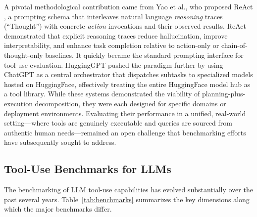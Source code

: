 \documentclass[conference]{IEEEtran}
\begin{document}
A pivotal methodological contribution came from Yao et al., who proposed ReAct \cite{yao2023react}, a prompting schema that interleaves natural language \emph{reasoning} traces (``Thought'') with concrete \emph{action} invocations and their observed results. ReAct demonstrated that explicit reasoning traces reduce hallucination, improve interpretability, and enhance task completion relative to action-only or chain-of-thought-only baselines. It quickly became the standard prompting interface for tool-use evaluation. HuggingGPT \cite{shen2024hugginggpt} pushed the paradigm further by using ChatGPT as a central orchestrator that dispatches subtasks to specialized models hosted on HuggingFace, effectively treating the entire HuggingFace model hub as a tool library. While these systems demonstrated the viability of planning-plus-execution decomposition, they were each designed for specific domains or deployment environments. Evaluating their performance in a unified, real-world setting---where tools are genuinely executable and queries are sourced from authentic human needs---remained an open challenge that benchmarking efforts have subsequently sought to address.

\subsection{Tool-Use Benchmarks for LLMs}

The benchmarking of LLM tool-use capabilities has evolved substantially over the past several years. Table~\ref{tab:benchmarks} summarizes the key dimensions along which the major benchmarks differ.
\end{document}
